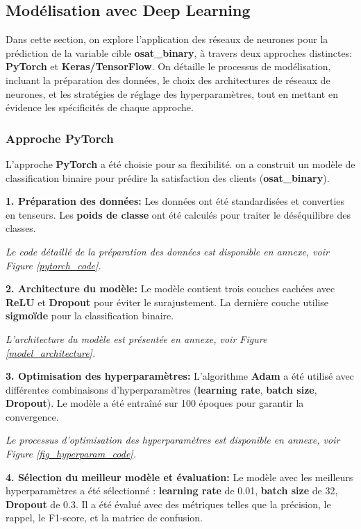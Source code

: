 \subsection{Modélisation avec Deep Learning}
Dans cette section, on explore l'application des réseaux de neurones pour la prédiction de la variable cible \textbf{osat\_binary}, à travers deux approches distinctes: \textbf{PyTorch} et \textbf{Keras/TensorFlow}. On détaille le processus de modélisation, incluant la préparation des données, le choix des architectures de réseaux de neurones, et les stratégies de réglage des hyperparamètres, tout en mettant en évidence les spécificités de chaque approche.

\subsubsection{Approche PyTorch}
L'approche \textbf{PyTorch} a été choisie pour sa flexibilité. on a construit un modèle de classification binaire pour prédire la satisfaction des clients (\textbf{osat\_binary}).

\textbf{1. Préparation des données:} Les données ont été standardisées et converties en tenseurs. Les \textbf{poids de classe} ont été calculés pour traiter le déséquilibre des classes. 

\textit{Le code détaillé de la préparation des données est disponible en annexe, voir Figure \ref{pytorch_code}.}

\textbf{2. Architecture du modèle:} Le modèle contient trois couches cachées avec \textbf{ReLU} et \textbf{Dropout} pour éviter le surajustement. La dernière couche utilise \textbf{sigmoïde} pour la classification binaire.

\textit{L'architecture du modèle est présentée en annexe, voir Figure \ref{model_architecture}.}

\textbf{3. Optimisation des hyperparamètres:} L'algorithme \textbf{Adam} a été utilisé avec différentes combinaisons d'hyperparamètres (\textbf{learning rate}, \textbf{batch size}, \textbf{Dropout}). Le modèle a été entraîné sur 100 époques pour garantir la convergence. 

\textit{Le processus d'optimisation des hyperparamètres est disponible en annexe, voir Figure \ref{fig_hyperparam_code}.}

\textbf{4. Sélection du meilleur modèle et évaluation:} Le modèle avec les meilleurs hyperparamètres a été sélectionné : \textbf{learning rate} de 0.01, \textbf{batch size} de 32, \textbf{Dropout} de 0.3. Il a été évalué avec des métriques telles que la précision, le rappel, le F1-score, et la matrice de confusion.

